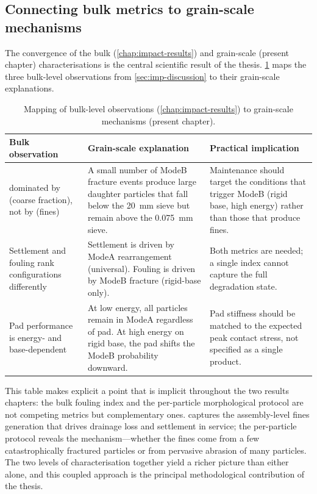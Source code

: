 \subsection{Connecting bulk metrics to grain-scale mechanisms}
\label{sec:morph-bulk-grain}

The convergence of the bulk (\cref{chap:impact-results}) and grain-scale
(present chapter) characterisations is the central scientific result of
the thesis. \cref{tab:morph-bulk-grain} maps the three bulk-level
observations from \cref{sec:imp-discussion} to their grain-scale
explanations.

\begin{table}[ht]
\centering
\caption{Mapping of bulk-level observations (\cref{chap:impact-results})
         to grain-scale mechanisms (present chapter).}
\label{tab:morph-bulk-grain}
\small
{}
\begin{tabular}{@{}p{4.5cm}p{4.5cm}p{4.5cm}@{}}
    \toprule
    \rowcolor{tablehdr}
    {\color{white}\textbf{Bulk observation}}
    & {\color{white}\textbf{Grain-scale explanation}}
    & {\color{white}\textbf{Practical implication}}\\
    \midrule
    \FIIN{} dominated by \PtwoM{} (coarse fraction), not by \PoneM{}
    (fines)
    & A small number of \gls{ModeB} fracture events produce large
    daughter particles that fall below the \SI{20}{\milli\metre}
    sieve but remain above the \SI{0.075}{\milli\metre} sieve.
    & Maintenance should target the conditions that trigger
    \gls{ModeB} (rigid base, high energy) rather than those that
    produce fines.\\
    Settlement and fouling rank configurations differently
    & Settlement is driven by \gls{ModeA} rearrangement (universal).
    Fouling is driven by \gls{ModeB} fracture (rigid-base only).
    & Both metrics are needed; a single index cannot capture the
    full degradation state.\\
    Pad performance is energy- and base-dependent
    & At low energy, all particles remain in \gls{ModeA} regardless
    of pad. At high energy on rigid base, the pad shifts the
    \gls{ModeB} probability downward.
    & Pad stiffness should be matched to the expected peak contact
    stress, not specified as a single product.\\
    \bottomrule
\end{tabular}
\end{table}

This table makes explicit a point that is implicit throughout the two
results chapters: the bulk fouling index \FIIN{} and the per-particle
morphological protocol are not competing metrics but complementary ones.
\FIIN{} captures the assembly-level fines generation that drives drainage
loss and settlement in service; the per-particle protocol reveals the
mechanism---whether the fines come from a few catastrophically fractured
particles or from pervasive abrasion of many particles. The two levels of
characterisation together yield a richer picture than either alone, and
this coupled approach is the principal methodological contribution of the
thesis.

